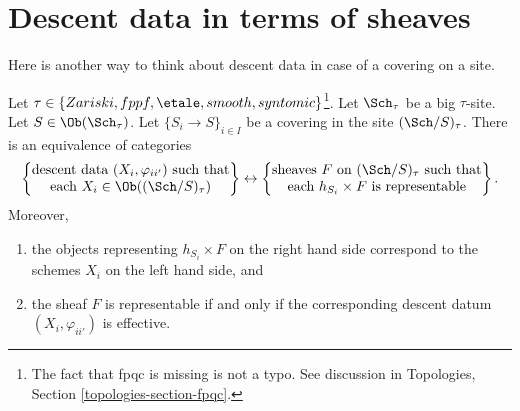 \section{Descent data in terms of sheaves}
\label{section-descent-data-sheaves}


\noindent
Here is another way to think about descent data
in case of a covering on a site.

\begin{lemma}
\label{lemma-descent-data-sheaves}
Let $\tau \in \{Zariski, fppf, \etale, smooth, syntomic\}$\footnote{The
fact that fpqc is missing is not a typo. See discussion
in Topologies, Section \ref{topologies-section-fpqc}.}.
Let $\Sch_\tau$ be a big $\tau$-site.
Let $S \in \Ob(\Sch_\tau)$.
Let $\{S_i \to S\}_{i \in I}$ be a covering in the
site $(\Sch/S)_\tau$. There is an equivalence of
categories
$$
\left\{
\begin{matrix}
\text{descent data }(X_i, \varphi_{ii'})\text{ such that}\\
\text{each }X_i \in \Ob((\Sch/S)_\tau)
\end{matrix}
\right\}
\leftrightarrow
\left\{
\begin{matrix}
\text{sheaves }F\text{ on }(\Sch/S)_\tau\text{ such that}\\
\text{each }h_{S_i} \times F\text{ is representable}
\end{matrix}
\right\}.
$$
Moreover,
\begin{enumerate}
\item the objects representing $h_{S_i} \times F$ on the right hand side
correspond to the schemes $X_i$ on the left hand side, and
\item the sheaf $F$ is representable if and only if the
corresponding descent datum $(X_i, \varphi_{ii'})$ is effective.
\end{enumerate}
\end{lemma}

